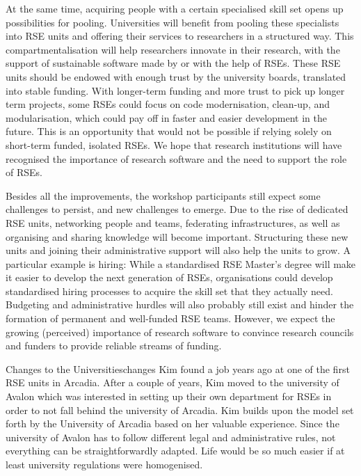 \documentclass{eceasst}
\begin{document}
At the same time, acquiring people with a certain specialised skill set
opens up possibilities for pooling.
Universities will benefit from pooling these specialists into RSE units
and offering their services to researchers in a structured way.
This compartmentalisation will help researchers innovate in their research,
with the support of sustainable software made by or with the help of RSEs.
These RSE units should be endowed with enough trust by the university boards, translated into stable funding.
With longer-term funding and more trust to pick up longer term projects,
some RSEs could focus on code modernisation, clean-up, and modularisation,
which could pay off in faster and easier development in the future.
This is an opportunity that would not be possible if relying solely on short-term funded, isolated RSEs.
We hope that research institutions will have recognised the importance of research software and the need to support the role of RSEs. 

Besides all the improvements, the workshop participants still expect some challenges to persist,
and new challenges to emerge.
Due to the rise of dedicated RSE units, networking people and teams,
federating infrastructures, as well as organising and sharing knowledge will become important.
Structuring these new units and joining their administrative support will also help the units to grow.
A particular example is hiring:
While a standardised RSE Master's degree will make it easier to develop the next generation of RSEs,
organisations could develop standardised hiring processes to acquire the skill set that they actually need.
Budgeting and administrative hurdles will also probably still exist and hinder the formation of permanent and well-funded RSE teams.
However, we expect the growing (perceived) importance of research software
to convince research councils and funders to provide reliable streams of funding.

\begin{story}{Changes to the Universities}{changes}
Kim found a job years ago at one of the first RSE units in Arcadia. After a couple of years, Kim moved to the university of
Avalon which was interested in setting up their own department for RSEs in order to not fall behind the university of Arcadia.
Kim builds upon the model set forth by the University of Arcadia based on her valuable experience. Since the university
of Avalon has to follow different legal and administrative rules, not everything can be straightforwardly adapted.
Life would be so much easier if at least university regulations were homogenised.
\end{story}
\end{document}
